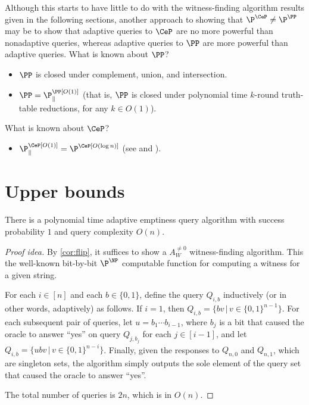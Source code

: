 \documentclass{article}
\begin{document}
Although this starts to have little to do with the witness-finding algorithm results given in the following sections, another approach to showing that $\P^{\CeP} \neq \P^\PP$ may be to show that adaptive queries to $\CeP$ are no more powerful than nonadaptive queries, whereas adaptive queries to $\PP$ are more powerful than adaptive queries.
What is known about $\PP$?
\begin{itemize}
\item $\PP$ is closed under complement, union, and intersection.
\item $\PP = \P^{\PP[O(1)]}_\parallel$ (that is, $\PP$ is closed under polynomial time $k$-round truth-table reductions, for any $k \in O(1)$).
\end{itemize}
What is known about $\CeP$?
\begin{itemize}
\item $\P^{\CeP[O(1)]}_\parallel = \P^{\CeP[O(\log n)]}$ (see \autocite[Theorem~5]{green93} and \autocite[Corollary~4.6]{ogiwara94}).
\end{itemize}

\section{Upper bounds}

\begin{theorem}\label{thm:naive}
  There is a polynomial time adaptive emptiness query algorithm with success probability $1$ and query complexity $O(n)$.
\end{theorem}
\begin{proof}[Proof idea]
  By \autoref{cor:flip}, it suffices to show a $A_W^{\neq 0}$ witness-finding algorithm.
  This the well-known bit-by-bit $\P^\NP$ computable function for computing a witness for a given string.

  For each $i \in [n]$ and each $b \in \{0, 1\}$, define the query $Q_{i, b}$ inductively (or in other words, adaptively) as follows.
  If $i = 1$, then $Q_{i, b} = \{ b v \, | \, v \in {\{0, 1\}}^{n - 1}\}$.
  For each subsequent pair of queries, let $u = b_1 \dotsb b_{i - 1}$, where $b_j$ is a bit that caused the oracle to answer ``yes'' on query $Q_{j, b_j}$ for each $j \in [i - 1]$, and let $Q_{i, b} = \{ u b v \, | \, v \in {\{0, 1\}}^{n - i}\}$.
  Finally, given the responses to $Q_{n, 0}$ and $Q_{n, 1}$, which are singleton sets, the algorithm simply outputs the sole element of the query set that caused the oracle to answer ``yes''.

  The total number of queries is $2n$, which is in $O(n)$.
\end{proof}
\end{document}
